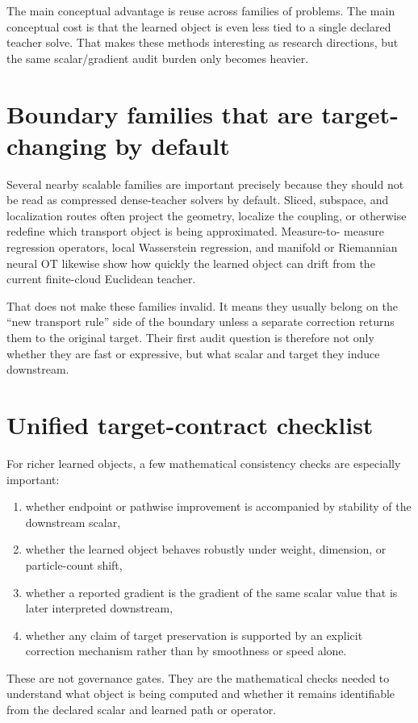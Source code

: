 The main conceptual advantage is reuse across families of problems.  The main
conceptual cost is that the learned object is even less tied to a single
declared teacher solve.  That makes these methods interesting as research
directions, but the same scalar/gradient audit burden only becomes heavier.

\section{Boundary families that are target-changing by default}
\label{sec:bf-neural-ot-dynamic-boundary-families}

Several nearby scalable families are important precisely because they should not
be read as compressed dense-teacher solvers by default.  Sliced, subspace, and
localization routes often project the geometry, localize the coupling, or
otherwise redefine which transport object is being approximated.  Measure-to-
measure regression operators, local Wasserstein regression, and manifold or
Riemannian neural OT likewise show how quickly the learned object can drift from
the current finite-cloud Euclidean teacher.

That does not make these families invalid.  It means they usually belong on the
``new transport rule'' side of the boundary unless a separate correction returns
them to the original target.  Their first audit question is therefore not only
whether they are fast or expressive, but what scalar and target they induce
downstream.

\section{Unified target-contract checklist}
\label{sec:bf-neural-ot-dynamic-promotion}

For richer learned objects, a few mathematical consistency checks are especially
important:
\begin{enumerate}[label=(\roman*)]
  \item whether endpoint or pathwise improvement is accompanied by stability of
  the downstream scalar,
  \item whether the learned object behaves robustly under weight, dimension, or
  particle-count shift,
  \item whether a reported gradient is the gradient of the same scalar value that
  is later interpreted downstream,
  \item whether any claim of target preservation is supported by an explicit
  correction mechanism rather than by smoothness or speed alone.
\end{enumerate}
These are not governance gates.  They are the mathematical checks needed to
understand what object is being computed and whether it remains identifiable from
the declared scalar and learned path or operator.

